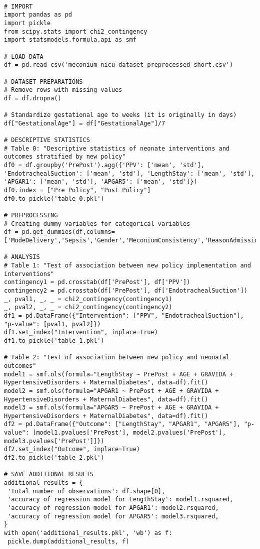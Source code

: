 \documentclass[11pt]{article}
\begin{document}
\begin{verbatim}

# IMPORT
import pandas as pd
import pickle
from scipy.stats import chi2_contingency
import statsmodels.formula.api as smf

# LOAD DATA
df = pd.read_csv('meconium_nicu_dataset_preprocessed_short.csv')

# DATASET PREPARATIONS
# Remove rows with missing values
df = df.dropna()

# Standardize gestational age to weeks (it is originally in days)
df["GestationalAge"] = df["GestationalAge"]/7 

# DESCRIPTIVE STATISTICS
# Table 0: "Descriptive statistics of neonate interventions and outcomes stratified by new policy"
df0 = df.groupby('PrePost').agg({'PPV': ['mean', 'std'], 'EndotrachealSuction': ['mean', 'std'], 'LengthStay': ['mean', 'std'], 'APGAR1': ['mean', 'std'], 'APGAR5': ['mean', 'std']})
df0.index = ["Pre Policy", "Post Policy"]
df0.to_pickle('table_0.pkl')

# PREPROCESSING 
# Creating dummy variables for categorical variables
df = pd.get_dummies(df,columns=['ModeDelivery','Sepsis','Gender','MeconiumConsistency','ReasonAdmission'])

# ANALYSIS
# Table 1: "Test of association between new policy implementation and interventions"
contingency1 = pd.crosstab(df['PrePost'], df['PPV'])
contingency2 = pd.crosstab(df['PrePost'], df['EndotrachealSuction'])
_, pval1, _, _ = chi2_contingency(contingency1)
_, pval2, _, _ = chi2_contingency(contingency2)
df1 = pd.DataFrame({"Intervention": ["PPV", "EndotrachealSuction"], "p-value": [pval1, pval2]})
df1.set_index("Intervention", inplace=True)
df1.to_pickle('table_1.pkl')

# Table 2: "Test of association between new policy and neonatal outcomes"
model1 = smf.ols(formula="LengthStay ~ PrePost + AGE + GRAVIDA + HypertensiveDisorders + MaternalDiabetes", data=df).fit()
model2 = smf.ols(formula="APGAR1 ~ PrePost + AGE + GRAVIDA + HypertensiveDisorders + MaternalDiabetes", data=df).fit()
model3 = smf.ols(formula="APGAR5 ~ PrePost + AGE + GRAVIDA + HypertensiveDisorders + MaternalDiabetes", data=df).fit()
df2 = pd.DataFrame({"Outcome": ["LengthStay", "APGAR1", "APGAR5"], "p-value": [model1.pvalues['PrePost'], model2.pvalues['PrePost'], model3.pvalues['PrePost']]})
df2.set_index("Outcome", inplace=True)
df2.to_pickle('table_2.pkl')

# SAVE ADDITIONAL RESULTS
additional_results = {
 'Total number of observations': df.shape[0], 
 'accuracy of regression model for LengthStay': model1.rsquared,
 'accuracy of regression model for APGAR1': model2.rsquared,
 'accuracy of regression model for APGAR5': model3.rsquared,
}
with open('additional_results.pkl', 'wb') as f:
 pickle.dump(additional_results, f)
 
\end{verbatim}
\end{document}
